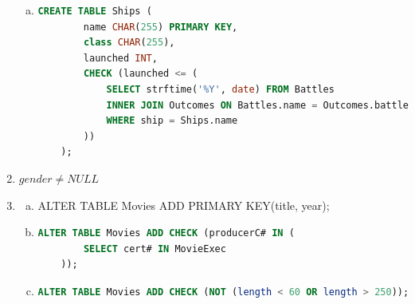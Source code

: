 \documentclass[12pt]{article}
\begin{document}
\begin{enumerate}[1.]
\begin{enumerate}[a)]
        \item

    \begin{lstlisting}[language=SQL]
    CREATE TABLE Ships (
        name CHAR(255) PRIMARY KEY,
        class CHAR(255),
        launched INT,
        CHECK (launched <= (
            SELECT strftime('%Y', date) FROM Battles
            INNER JOIN Outcomes ON Battles.name = Outcomes.battle
            WHERE ship = Ships.name
        ))
    );
    \end{lstlisting}

    \end{enumerate}

    \item $gender \neq NULL$
    \item

    \begin{enumerate}[a)]
        \item ALTER TABLE Movies ADD PRIMARY KEY(title, year);
        \item
    \begin{lstlisting}[language=SQL]
    ALTER TABLE Movies ADD CHECK (producerC# IN (
        SELECT cert# IN MovieExec
    ));
    \end{lstlisting}

        \item

    \begin{lstlisting}[language=SQL]
    ALTER TABLE Movies ADD CHECK (NOT (length < 60 OR length > 250));
    \end{lstlisting}

    \end{enumerate}

\end{enumerate}
\end{document}
